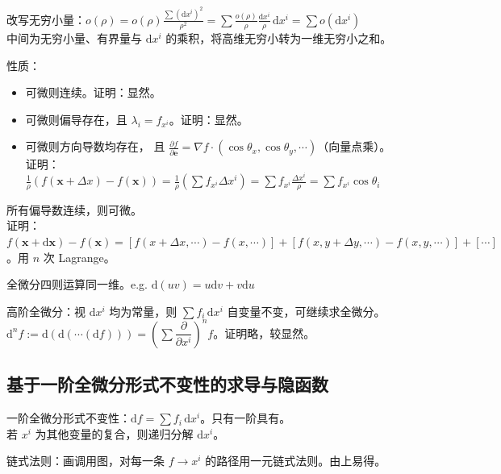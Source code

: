 \documentclass[12pt, a4paper, UTF8, openany]{ctexbook}
\newcommand{\dif}{\mathrm{d}}
\newcommand{\difx}{\,\mathrm{d}x}
\newcommand{\mat}[1]{\mathbf{#1}}
\begin{document}
        改写无穷小量：$o(\rho) = o(\rho)\frac{\sum (\dif x^i)^2}{\rho^2} 
        = \sum \frac{o(\rho)}{\rho} \frac{\dif x^i}{\rho} \difx^i = \sum o(\dif x^i)$ \\
        中间为无穷小量、有界量与 $\dif x^i$ 的乘积，将高维无穷小转为一维无穷小之和。

        性质：
        \begin{itemize}
            \item 可微则连续。证明：显然。
            \item 可微则偏导存在，且 $\lambda_i = f_{x^i}$。证明：显然。
            \item 可微则方向导数均存在，
            且 $\frac{\partial f}{\partial \mat{e}} = \nabla f \cdot (\cos\theta_x, \cos\theta_y, \cdots)$（向量点乘）。\\
                证明：$\frac{1}{\rho}(f(\mat{x} + \Delta x) - f(\mat{x})) = \frac{1}{\rho}(\sum f_{x^i} \Delta x^i) 
                = \sum f_{x^i} \frac{\Delta x^i}{\rho} = \sum f_{x^i} \cos\theta_i$
        \end{itemize}

        所有偏导数连续，则可微。\\
        证明：$f(\mat{x} + \dif\mat{x}) - f(\mat{x}) = 
        [f(x + \Delta x, \cdots) - f(x, \cdots)] + 
        [f(x, y + \Delta y, \cdots) - f(x, y, \cdots)] + [\cdots]$。用 $n$ 次 Lagrange。

        全微分四则运算同一维。e.g. $\dif(uv) = u\dif v + v \dif u$

        高阶全微分：视 $\dif x^i$ 均为常量，则 $\sum f_i \, \dif x^i$ 自变量不变，可继续求全微分。\\
        $\dif^n f := \dif(\dif(\cdots(\dif f))) = (\sum \dfrac{\partial}{\partial x^i})^n f$。证明略，较显然。

        \subsection{基于一阶全微分形式不变性的求导与隐函数}
        一阶全微分形式不变性：$\dif f = \sum f_i \, \dif x^i$。{\heiti 只有一阶具有}。\\
        若 $x^i$ 为其他变量的复合，则{\heiti 递归}分解 $\dif x^i$。

        链式法则：画调用图，对每一条 $f \to x^i$ 的路径用一元链式法则。由上易得。
\end{document}
